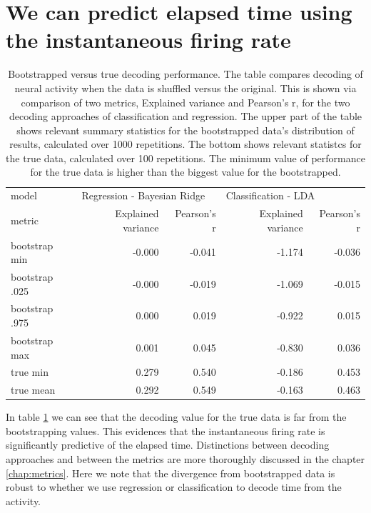 \section{We can predict elapsed time using the instantaneous firing rate}
    \begin{table}[]
        \centering
        \begin{tabular}{l|rr|rr}
            \hline
            model & \multicolumn{2}{l}{Regression - Bayesian Ridge} & \multicolumn{2}{l}{Classification - LDA} \\
            metric & Explained variance & Pearson's r & Explained variance & Pearson's r \\
            \hline
            bootstrap min  &             -0.000 &      -0.041 &             -1.174 &      -0.036 \\
            bootstrap .025  &             -0.000 &      -0.019 &             -1.069 &      -0.015 \\
            bootstrap .975 &              0.000 &       0.019 &             -0.922 &       0.015 \\
            bootstrap max  &              0.001 &       0.045 &             -0.830 &       0.036 \\
            \hline
            true min  &              0.279 &       0.540 &             -0.186 &       0.453 \\
            true mean &              0.292 &       0.549 &             -0.163 &       0.463 \\
            \hline
        \end{tabular}
        \caption{Bootstrapped versus true decoding performance. The table compares decoding of neural activity when the data is shuffled versus the original. This is shown via comparison of two metrics, Explained variance and Pearson's r, for the two decoding approaches of classification and regression. The upper part of the table shows relevant summary statistics for the bootstrapped data's distribution of results, calculated over 1000 repetitions. The bottom shows relevant statistcs for the true data, calculated over 100 repetitions. The minimum value of performance for the true data is higher than the biggest value for the bootstrapped.}
        \label{tab:bootstrap_time_representation}
    \end{table}
    
    In table \ref{tab:bootstrap_time_representation} we can see that the decoding value for the true data is far from the bootstrapping values. This evidences that the instantaneous firing rate is significantly predictive of the elapsed time. Distinctions between decoding approaches and between the metrics are more thoroughly discussed in the chapter \ref{chap:metrics}. Here we note that the divergence from bootstrapped data is robust to whether we use regression or classification to decode time from the activity. 
    
